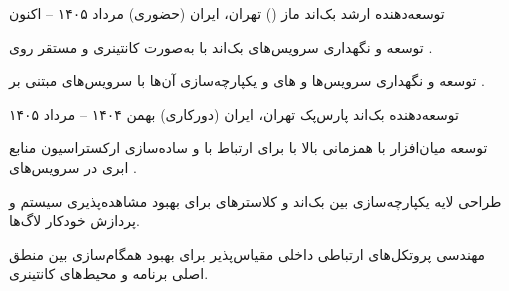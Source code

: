 

\begin{cventries}
\cventry
{توسعه‌دهنده ارشد بک‌اند} %
{ماز ()} %
{تهران، ایران (حضوری)} %
{مرداد ۱۴۰۵ -- اکنون} %
{
	\begin{cvitems}
		\item {توسعه و نگهداری سرویس‌های بک‌اند با \textbf{} به‌صورت کانتینری و مستقر روی \textbf{}.}
		\item {توسعه و نگهداری سرویس‌ها و های \textbf{} و یکپارچه‌سازی آن‌ها با سرویس‌های مبتنی بر .}
	\end{cvitems}
}

\cventry
{توسعه‌دهنده بک‌اند} %
{پارس‌پک} %
{تهران، ایران (دورکاری)} %
{بهمن ۱۴۰۴ -- مرداد ۱۴۰۵} %
{
	\begin{cvitems}
		\item {توسعه میان‌افزار با همزمانی بالا با \textbf{} برای ارتباط با \textbf{} و ساده‌سازی ارکستراسیون منابع ابری در سرویس‌های \lr{PaaS}.}
		\item {طراحی لایه یکپارچه‌سازی بین بک‌اند \textbf{} و کلاسترهای  برای بهبود مشاهده‌پذیری سیستم و پردازش خودکار لاگ‌ها.}
		\item {مهندسی پروتکل‌های ارتباطی داخلی مقیاس‌پذیر برای بهبود همگام‌سازی بین منطق اصلی برنامه و محیط‌های کانتینری.}
	\end{cvitems}
}


\end{cventries}
